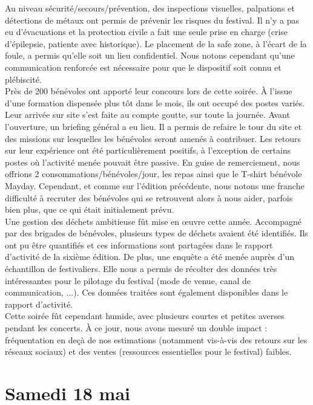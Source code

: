 \documentclass[12pt,a4paper]{report}
\begin{document}
Au niveau sécurité/secours/prévention, des inspections visuelles, palpations et détections de métaux ont permis de prévenir les risques du festival. Il n'y a pas eu d'évacuations et la protection civile a fait une seule prise en charge (crise d'épilepsie, patiente avec historique). Le placement de la safe zone, à l'écart de la foule, a permis qu'elle soit un lieu confidentiel. Nous notons cependant qu'une communication renforcée est nécessaire pour que le dispositif soit connu et plébiscité.\\

Près de 200 bénévoles ont apporté leur concours lors de cette soirée. À l'issue d'une formation dispensée plus tôt dans le mois, ils ont occupé des postes variés. Leur arrivée sur site s'est faite au compte goutte, sur toute la journée. Avant l'ouverture, un briefing général a eu lieu. Il a permis de refaire le tour du site et des missions sur lesquelles les bénévoles seront amenés à contribuer. Les retours sur leur expérience ont été particulièrement positifs, à l'exception de certains postes où l'activité menée pouvait être passive. En guise de remerciement, nous offrions 2 consommations/bénévoles/jour, les repas ainsi que le T-shirt bénévole Mayday. Cependant, et comme sur l'édition précédente, nous notons une franche difficulté à recruter des bénévoles qui se retrouvent alors à nous aider, parfois bien plus, que ce qui était initialement prévu.\\

Une gestion des déchets ambitieuse fût mise en œuvre cette année. Accompagné par des brigades de bénévoles, plusieurs types de déchets avaient été identifiés. Ils ont pu être quantifiés et ces informations sont partagées dans le rapport d'activité de la sixième édition. De plus, une enquête a été menée auprès d'un échantillon de festivaliers. Elle nous a permis de récolter des données très intéressantes pour le pilotage du festival (mode de venue, canal de communication, ...). Ces données traitées sont également disponibles dans le rapport d'activité.\\

Cette soirée fût cependant humide, avec plusieurs courtes et petites averses pendant les concerts. À ce jour, nous avons mesuré un double impact : fréquentation en deçà de nos estimations (notamment vis-à-vis des retours sur les réseaux sociaux) et des ventes (ressources essentielles pour le festival) faibles.\\

\section{Samedi 18 mai}
\end{document}
